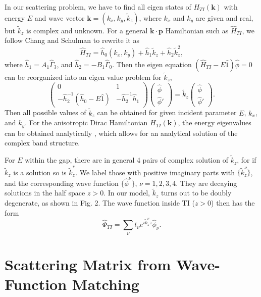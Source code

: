 \documentclass[11pt,revtex,aps]{report}
\def\v#1{\mathbf{#1}}
\begin{document}
In our scattering problem, we have to find all eigen states of $H_{TI}(\v{k})$ with energy $E$ and 
wave vector $\v{k}=(k_x,k_y,\tilde{k}_z)$, where $k_x$ and $k_y$ are given and real, but $\tilde{k}_z$ is 
complex and unknown. For a general $\mathbf{k\cdot p}$ Hamiltonian such as $\hat{H}_{TI}$, 
we follow Chang and Schulman \cite{chang82} to rewrite it as
\[
\hat{H}_{TI}=\hat{h}_0(k_x,k_y)+\hat{h}_1 \tilde{k}_z+\hat{h}_2\tilde{k}^2_z,
\]
where $\hat{h}_1=A_1\hat{\Gamma}_3$, and $\hat{h}_2=-B_1\hat{\Gamma}_0$. 
Then the eigen equation $(\hat{H}_{TI}-E\hat{1})\hat{\phi}=0$ can be reorganized into an 
eigen value problem for $\tilde{k}_z$,
\[
\left(
\begin{array}{ll}
  0 & 1   \\
  -\hat{h}_2^{-1}(\hat{h}_0-E\hat{1}) & -\hat{h}_2^{-1}\hat{h}_1
  \end{array}
\right)
\left(
\begin{array}{l}
  \hat{\phi}   \\
  \hat{\phi}'  
\end{array}
\right)
=\tilde{k}_z \left(
\begin{array}{l}
  \hat{\phi}   \\
  \hat{\phi}'    
\end{array}
\right).
\]
Then all possible values of $\tilde{k}_z$ can be obtained for given incident parameter $E$, $k_x$, and $k_y$. 
For the anisotropic Dirac Hamiltonian $H_{TI}(\v{k})$, the energy eigenvalues can be obtained 
analytically \cite{qi_field}, which allows for an analytical solution of the complex band structure.

For $E$ within the gap, there are in general 4 pairs of complex solution of $\tilde{k}_z$, for if $\tilde{k}_z$ is a solution so is $\tilde{k}^*_z$. 
We label those with positive imaginary parts with $\{\tilde{k}^\nu_z\}$, and the corresponding wave function $\{\hat{\phi}^\nu \}$, $\nu=1,2,3,4$. They are decaying solutions in the half space $z>0$. In our model, $\tilde{k}_z$ turns out to be doubly degenerate, as shown in Fig. 2. The wave function inside TI ($z>0$) then has the form
\[
\hat{\Phi}_{TI}=\sum_{\nu} t_\nu e^{i\tilde{k}^\nu_z z} \hat{\phi}_\nu.
\]

\section{Scattering Matrix from Wave-Function Matching} 
\end{document}
